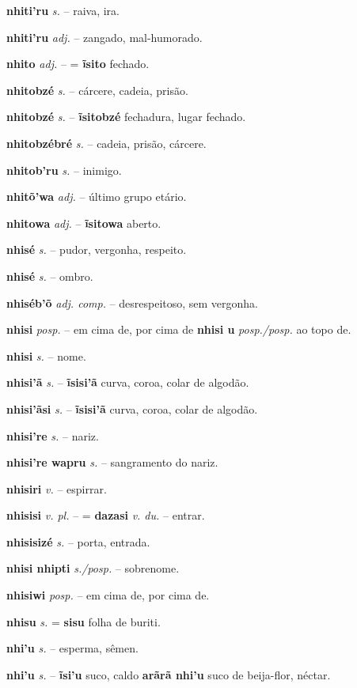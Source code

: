 \textbf{nhiti'ru} \textit{s.} -- raiva, ira.

\textbf{nhiti'ru} \textit{adj.} -- zangado, mal-humorado.

\textbf{nhito} \textit{adj.} -- = \textbf{ĩsito} fechado.

\textbf{nhitobzé} \textit{s.} -- cárcere, cadeia, prisão.

\textbf{nhitobzé} \textit{s.} -- \textbf{ĩsitobzé} fechadura, lugar fechado.

\textbf{nhitobzébré} \textit{s.} -- cadeia, prisão, cárcere.

\textbf{nhitob'ru} \textit{s.} -- inimigo.

\textbf{nhitõ'wa} \textit{adj.} -- último grupo etário.

\textbf{nhitowa} \textit{adj.} -- \textbf{ĩsitowa} aberto.

\textbf{nhisé} \textit{s.} -- pudor, vergonha, respeito.

\textbf{nhisé} \textit{s.} -- ombro.

\textbf{nhiséb'õ} \textit{adj. comp.} -- desrespeitoso, sem vergonha.

\textbf{nhisi} \textit{posp.} -- em cima de, por cima de  \textbf{nhisi u} \textit{posp./posp.} ao topo de.

\textbf{nhisi} \textit{s.} -- nome.

\textbf{nhisi'ã} \textit{s.} -- \textbf{ĩsisi'ã} curva, coroa, colar de algodão.

\textbf{nhisi'ãsi} \textit{s.} -- \textbf{ĩsisi'ã} curva, coroa, colar de algodão.

\textbf{nhisi're} \textit{s.} -- nariz.

\textbf{nhisi're wapru} \textit{s.} -- sangramento do nariz.

\textbf{nhisiri} \textit{v.} -- espirrar.

\textbf{nhisisi} \textit{v. pl.} -- = \textbf{dazasi} \textit{v. du.} -- entrar.

\textbf{nhisisizé} \textit{s.} -- porta, entrada.

\textbf{nhisi nhipti} \textit{s./posp.} -- sobrenome.

\textbf{nhisiwi} \textit{posp.} -- em cima de, por cima de.

\textbf{nhisu} \textit{s.} = \textbf{sisu} folha de buriti.

\textbf{nhi'u} \textit{s.} -- esperma, sêmen.

\textbf{nhi'u} \textit{s.} -- \textbf{ĩsi'u} suco, caldo  \textbf{arãrã nhi'u} suco de beija-flor, néctar.

